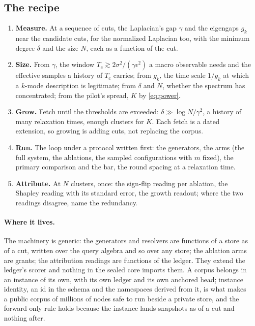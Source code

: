 \documentclass[11pt,a4paper]{article}
\theoremstyle{plain}
\theoremstyle{definition}
\theoremstyle{remark}
\begin{document}
\subsection{The recipe}\label{sec:recipe}

\begin{enumerate}
\item \textbf{Measure.} At a sequence of cuts, the Laplacian's gap $\gamma$ and the eigengaps $g_k$
  near the candidate cuts, for the normalized Laplacian too, with the minimum degree $\delta$ and
  the size $N$, each as a function of the cut.
\item \textbf{Size.} From $\gamma$, the window $T_c \gtrsim 2\sigma^2/(\gamma\epsilon^2)$ a macro
  observable needs and the effective samples a history of $T_c$ carries; from $g_k$, the time scale
  $1/g_k$ at which a $k$-mode description is legitimate; from $\delta$ and $N$, whether the spectrum
  has concentrated; from the pilot's spread, $K$ by \eqref{eq:power}.
\item \textbf{Grow.} Fetch until the thresholds are exceeded: $\delta \gg \log N/\gamma^2$, a history
  of many relaxation times, enough clusters for $K$. Each fetch is a dated extension, so growing is
  adding cuts, not replacing the corpus.
\item \textbf{Run.} The loop under a protocol written first: the generators, the arms (the full
  system, the ablations, the sampled configurations with $m$ fixed), the primary comparison and the
  bar, the round spacing at a relaxation time.
\item \textbf{Attribute.} At $N$ clusters, once: the sign-flip reading per ablation, the Shapley
  reading with its standard error, the growth readout; where the two readings disagree, name the
  redundancy.
\end{enumerate}

\paragraph{Where it lives.}
The machinery is generic: the generators and resolvers are functions of a store as of a cut,
written over the query algebra and so over any store; the ablation arms are grants; the attribution
readings are functions of the ledger. They extend the ledger's scorer and nothing in the sealed core
imports them. A corpus belongs in an instance of its own, with its own ledger and its own anchored
head; instance identity, an id in the schema and the namespaces derived from it, is what makes a
public corpus of millions of nodes safe to run beside a private store, and the forward-only rule
holds because the instance lands snapshots as of a cut and nothing after.
\end{document}
